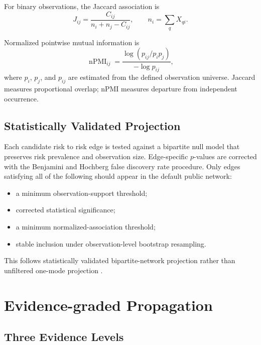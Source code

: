 \documentclass[11pt,a4paper]{article}
\begin{document}
For binary observations, the Jaccard association is
\begin{equation}
J_{ij} =
\frac{C_{ij}}
{n_i+n_j-C_{ij}},
\qquad
n_i=\sum_q X_{qi}.
\end{equation}

Normalized pointwise mutual information is
\begin{equation}
\operatorname{nPMI}_{ij}
=
\frac{
\log\left(p_{ij}/p_ip_j\right)
}{
-\log p_{ij}
},
\end{equation}
where $p_i$, $p_j$, and $p_{ij}$ are estimated from the defined observation universe. Jaccard measures proportional overlap; nPMI measures departure from independent occurrence.

\subsection{Statistically Validated Projection}

Each candidate risk to risk edge is tested against a bipartite null model that preserves risk prevalence and observation size. Edge-specific $p$-values are corrected with the Benjamini and Hochberg false discovery rate procedure. Only edges satisfying all of the following should appear in the default public network:
\begin{itemize}
  \item a minimum observation-support threshold;
  \item corrected statistical significance;
  \item a minimum normalized-association threshold;
  \item stable inclusion under observation-level bootstrap resampling.
\end{itemize}

This follows statistically validated bipartite-network projection rather than unfiltered one-mode projection \cite{tumminello2011,cimini2022}.

\section{Evidence-graded Propagation}

\subsection{Three Evidence Levels}
\end{document}
